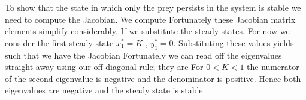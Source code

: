 To show that the state in which only the prey persists in the system is stable we need to compute the Jacobian. We compute 
Fortunately these Jacobian matrix elements simplify considerably. If we substitute the steady states. For now we consider the first steady state 
$x_1^*=K$ , $y_1^*=0$. Substituting these values yields 
such that we have the Jacobian 
Fortunately we can read off the eigenvalues straight away using our 
off-diagonal rule; they are
For $0<K<1$ the numerator of the second eigenvalue is negative and the denominator is positive. Hence both eigenvalues are negative and the 
steady state is stable.

